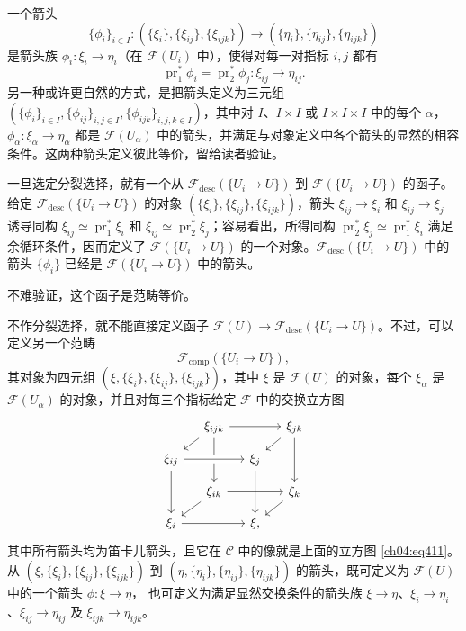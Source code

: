 一个箭头
\[
 \{\phi_i\}_{i\in I}\colon
 (\{\xi_i\},\{\xi_{ij}\},\{\xi_{ijk}\})
 \longrightarrow(\{\eta_i\},\{\eta_{ij}\},\{\eta_{ijk}\})
\]
是箭头族 $\phi_i\colon\xi_i\to\eta_i$（在 $\mathcal F(U_i)$ 中），使得对每一对指标 $i,j$ 都有
\[
 \operatorname{pr}_1^*\phi_i=\operatorname{pr}_2^*\phi_j\colon\xi_{ij}\longrightarrow\eta_{ij}.
\]
另一种或许更自然的方式，是把箭头定义为三元组
$(\{\phi_i\}_{i\in I},\{\phi_{ij}\}_{i,j\in I},\{\phi_{ijk}\}_{i,j,k\in I})$，其中对 $I$、$I\times I$ 或 $I\times I\times I$ 中的每个 $\alpha$，$\phi_\alpha\colon\xi_\alpha\to\eta_\alpha$ 都是 $\mathcal F(U_\alpha)$ 中的箭头，并满足与对象定义中各个箭头的显然的相容条件。这两种箭头定义彼此等价，留给读者验证。

一旦选定分裂选择，就有一个从 $\mathcal F_{\mathrm{desc}}(\{U_i\to U\})$ 到 $\mathcal F(\{U_i\to U\})$ 的函子。给定 $\mathcal F_{\mathrm{desc}}(\{U_i\to U\})$ 的对象 $(\{\xi_i\},\{\xi_{ij}\},\{\xi_{ijk}\})$，箭头 $\xi_{ij}\to\xi_i$ 和 $\xi_{ij}\to\xi_j$ 诱导同构 $\xi_{ij}\simeq\operatorname{pr}_1^*\xi_i$ 和 $\xi_{ij}\simeq\operatorname{pr}_2^*\xi_j$；容易看出，所得同构 $\operatorname{pr}_2^*\xi_j\simeq\operatorname{pr}_1^*\xi_i$ 满足余循环条件，因而定义了 $\mathcal F(\{U_i\to U\})$ 的一个对象。$\mathcal F_{\mathrm{desc}}(\{U_i\to U\})$ 中的箭头 $\{\phi_i\}$ 已经是 $\mathcal F(\{U_i\to U\})$ 中的箭头。

不难验证，这个函子是范畴等价。

不作分裂选择，就不能直接定义函子 $\mathcal F(U)\to\mathcal F_{\mathrm{desc}}(\{U_i\to U\})$。不过，可以定义另一个范畴
\[
 \mathcal F_{\mathrm{comp}}(\{U_i\to U\}),
\]
其对象为四元组 $(\xi,\allowbreak\{\xi_i\},\allowbreak\{\xi_{ij}\},\allowbreak\{\xi_{ijk}\})$，其中 $\xi$ 是 $\mathcal F(U)$ 的对象，每个 $\xi_\alpha$ 是 $\mathcal F(U_\alpha)$ 的对象，并且对每三个指标给定 $\mathcal F$ 中的交换立方图
\[
\begin{tikzcd}[row sep=.9em,column sep=1.2em]
 &\xi_{ijk}\arrow[rr]\arrow[dl]\arrow[dd]&&\xi_{jk}\arrow[dl]\arrow[dd]\\
 \xi_{ij}\arrow[rr,crossing over]\arrow[dd]&&\xi_j\arrow[dd]\\
 &\xi_{ik}\arrow[rr]\arrow[dl]&&\xi_k\arrow[dl]\\
 \xi_i\arrow[rr]&&\xi,
\end{tikzcd}
\]
其中所有箭头均为笛卡儿箭头，且它在 $\mathcal C$ 中的像就是上面的立方图 \eqref{ch04:eq411}。从 $(\xi,\allowbreak\{\xi_i\},\allowbreak\{\xi_{ij}\},\allowbreak\{\xi_{ijk}\})$ 到 $(\eta,\allowbreak\{\eta_i\},\allowbreak\{\eta_{ij}\},\allowbreak\{\eta_{ijk}\})$ 的箭头，既可定义为 $\mathcal F(U)$ 中的一个箭头 $\phi\colon\xi\to\eta$，
也可定义为满足显然交换条件的箭头族 $\xi\to\eta$、$\xi_i\to\eta_i$、$\xi_{ij}\to\eta_{ij}$ 及 $\xi_{ijk}\to\eta_{ijk}$。

